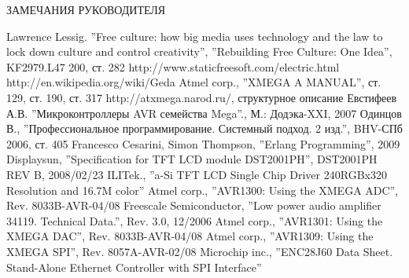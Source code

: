 \documentclass[russian,simple,utf8,pointsubsection]{eskdtext}
\begin{document}

\newpage

\begin{center}ЗАМЕЧАНИЯ РУКОВОДИТЕЛЯ\end{center}
\newpage

\tableofcontents
\newpage











\begin{thebibliography}{99}
 Lawrence Lessig. ''Free culture: how big media uses technology and the law to lock down
culture and control creativity'', ''Rebuilding Free Culture: One Idea'', KF2979.L47 200, ст. 282
 http://www.staticfreesoft.com/electric.html
 http://en.wikipedia.org/wiki/Geda
 Atmel corp., ''XMEGA A MANUAL'', ст. 129, ст. 190, ст. 317
 http://atxmega.narod.ru/, структурное описание
 Евстифеев А.В. ''Микроконтроллеры AVR семейства Mega''., М.: Додэка-XXI, 2007
 Одинцов В., ''Профессиональное программирование. Системный подход. 2 изд.'', BHV-СПб 2006, ст. 405
 Francesco Cesarini, Simon Thompson, ''Erlang Programming'', 2009
 Displaysun, ''Specification for TFT LCD module DST2001PH'', DST2001PH REV B, 2008/02/23
 ILITek., ''a-Si TFT LCD Single Chip Driver 240RGBx320 Resolution and 16.7M color''
 Atmel corp., ''AVR1300: Using the XMEGA ADC'', Rev. 8033B-AVR-04/08
 Freescale Semiconductor, ''Low power audio amplifier 34119. Technical Data.'', Rev. 3.0, 12/2006
 Atmel corp., ''AVR1301: Using the XMEGA DAC'', Rev. 8033B-AVR-04/08
 Atmel corp., ''AVR1309: Using the XMEGA SPI'', Rev. 8057A-AVR-02/08
 Microchip inc., ''ENC28J60 Data Sheet. Stand-Alone Ethernet Controller with SPI Interface''
\end{thebibliography}
\end{document}
